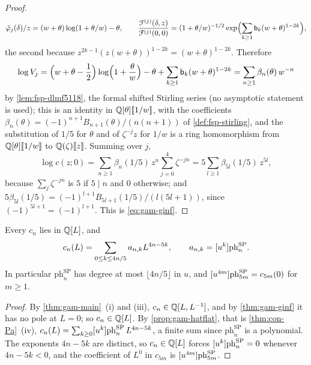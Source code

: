 \begin{proof}
\[
\tilde\varphi_j(\delta)/z=(w+\theta)\log(1+\theta/w)-\theta,\qquad \frac{\mathcal{F}^{(j)}(\delta,z)}{\mathcal{F}^{(j)}(0,0)}=(1+\theta/w)^{-1/2}\exp\Bigl(\sum_{k\geq 1}\mathsf{b}_k(w+\theta)^{1-2k}\Bigr),
\]
the second because $z^{2k-1}(z(w+\theta))^{1-2k}=(w+\theta)^{1-2k}$. Therefore
\[
\log V_j=\Bigl(w+\theta-\frac12\Bigr)\log\Bigl(1+\frac{\theta}{w}\Bigr)-\theta+\sum_{k\geq 1}\mathsf{b}_k(w+\theta)^{1-2k}=\sum_{n\geq 1}\beta_n(\theta)\,w^{-n}
\]
by \cref{lem:fsp-dlmf5118}, the formal shifted Stirling series (no asymptotic statement is used); this is an identity in $\mathbb{Q}[\theta][\![ 1/w ]\!]$, with the coefficients $\beta_n(\theta)=(-1)^{n+1}B_{n+1}(\theta)/(n(n+1))$ of \cref{def:fsp-stirling}, and the substitution of $1/5$ for $\theta$ and of $\zeta^{-j}z$ for $1/w$ is a ring homomorphism from $\mathbb{Q}[\theta][\![ 1/w ]\!]$ to $\mathbb{Q}(\zeta)[\![ z ]\!]$. Summing over $j$,
\[
\log c(z;0)=\sum_{n\geq 1}\beta_n(1/5)\,z^n\sum_{j=0}^4\zeta^{-jn}=5\sum_{l\geq 1}\beta_{5l}(1/5)\,z^{5l},
\]
because $\sum_j\zeta^{-jn}$ is $5$ if $5\mid n$ and $0$ otherwise; and $5\beta_{5l}(1/5)=(-1)^{l+1}B_{5l+1}(1/5)/(l(5l+1))$, since $(-1)^{5l+1}=(-1)^{l+1}$. This is \eqref{eq:gam-ginf}.
\end{proof}

\begin{cor}
\label{cor:gam-poly}
Every $c_n$ lies in $\mathbb{Q}[L]$, and
\[
c_n(L)=\sum_{0\leq k\leq 4n/5}a_{n,k}L^{4n-5k},\qquad a_{n,k}=[u^k]\mathrm{ph}^{\mathrm{SP}}_n.
\]
In particular $\mathrm{ph}^{\mathrm{SP}}_n$ has degree at most $\lfloor 4n/5\rfloor$ in $u$, and $[u^{4m}]\mathrm{ph}^{\mathrm{SP}}_{5m}=c_{5m}(0)$ for $m\geq 1$.
\end{cor}

\begin{proof}
By \cref{thm:gam-main}~(i) and (iii), $c_n\in\mathbb{Q}[L,L^{-1}]$, and by \cref{thm:gam-ginf} it has no pole at $L=0$; so $c_n\in\mathbb{Q}[L]$. By \cref{prop:gam-hatflat}, that is \cref{thm:con-Pa}~(iv), $c_n(L)=\sum_{k\geq 0}[u^k]\mathrm{ph}^{\mathrm{SP}}_n\,L^{4n-5k}$, a finite sum since $\mathrm{ph}^{\mathrm{SP}}_n$ is a polynomial. The exponents $4n-5k$ are distinct, so $c_n\in\mathbb{Q}[L]$ forces $[u^k]\mathrm{ph}^{\mathrm{SP}}_n=0$ whenever $4n-5k<0$, and the coefficient of $L^0$ in $c_{5m}$ is $[u^{4m}]\mathrm{ph}^{\mathrm{SP}}_{5m}$.
\end{proof}

